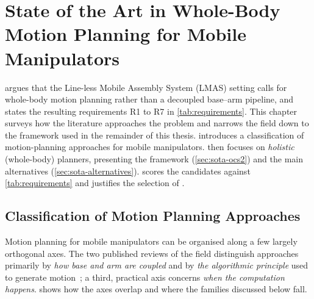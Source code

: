 \chapter{State of the Art in Whole-Body Motion Planning for Mobile
  Manipulators}
\label{ch:sota}

 argues that the Line-less Mobile Assembly System
(LMAS) setting calls for whole-body motion planning rather than a
decoupled base--arm pipeline, and states the resulting requirements R1
to R7 in \cref{tab:requirements}. This chapter surveys how the
literature approaches the problem and narrows the field down to the
framework used in the remainder of this thesis.
 introduces a classification of
motion-planning approaches for mobile manipulators.
 then focuses on \emph{holistic} (whole-body)
planners, presenting the \ocs{} framework (\cref{sec:sota-ocs2}) and the
main alternatives (\cref{sec:sota-alternatives}).
 scores the candidates against
\cref{tab:requirements} and justifies the selection of \ocs{}.

\section{Classification of Motion Planning Approaches}
\label{sec:sota-classification}

Motion planning for mobile manipulators can be organised along a few
largely orthogonal axes. The two published reviews of the field
distinguish approaches primarily by \emph{how base and arm are coupled}
and by \emph{the algorithmic principle} used to generate
motion~\cite{Sandakalum2022Survey,Thakar2023MobileManip}; a third,
practical axis concerns \emph{when the computation happens}.
 shows how the axes overlap and where the
families discussed below fall.

